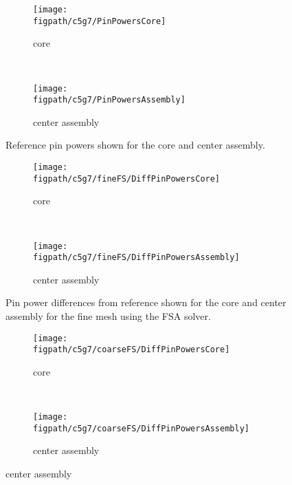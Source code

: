 {{{      \begin{figure}[htbp]
        \centering
        \begin{subfigure}[t]{0.49\textwidth}
          \centering
          \texttt{[image: \\figpath/c5g7/PinPowersCore]}
          \caption{core \label{fig:LSMOC:C5G7:Reference:PinPowers:Core}}
        \end{subfigure}%
        ~
        \begin{subfigure}[t]{0.49\textwidth}
          \centering
            \texttt{[image: \\figpath/c5g7/PinPowersAssembly]}
            \caption{center assembly\label{fig:LSMOC:C5G7:Reference:PinPowers:Assembly}}
        \end{subfigure}
        \caption{Reference pin powers shown for the core and center assembly.\label{figs:LSMOC:C5G7:Reference:PinPowers}}
      \end{figure}
      \begin{figure}[htbp]
        \centering
        \begin{subfigure}[t]{0.49\textwidth}
          \centering
          \texttt{[image: \\figpath/c5g7/fineFS/DiffPinPowersCore]}
          \caption{core\label{fig:LSMOC:C5G7:FineFS:PinPowers:Core}}
        \end{subfigure}%
        ~
        \begin{subfigure}[t]{0.49\textwidth}
          \centering
            \texttt{[image: \\figpath/c5g7/fineFS/DiffPinPowersAssembly]}
            \caption{center assembly\label{fig:LSMOC:C5G7:FineFS:PinPowers:Assembly}}
        \end{subfigure}
        \caption{Pin power differences from reference shown for the core and center assembly for the fine mesh using the FSA solver.\label{figs:LSMOC:C5G7:FineFS:PinPowers}}
      \end{figure}
      \begin{figure}[htbp]
        \centering
        \begin{subfigure}[t]{0.49\textwidth}
          \centering
          \texttt{[image: \\figpath/c5g7/coarseFS/DiffPinPowersCore]}
          \caption{core\label{fig:LSMOC:C5G7:CoarseFS:PinPowers:Core}}
        \end{subfigure}%
        ~
        \begin{subfigure}[t]{0.49\textwidth}
          \centering
            \texttt{[image: \\figpath/c5g7/coarseFS/DiffPinPowersAssembly]}
            \caption{center assembly\label{fig:LSMOC:C5G7:CoarseFS:PinPowers:Assembly}}

\end{subfigure}
\end{figure}}}}

